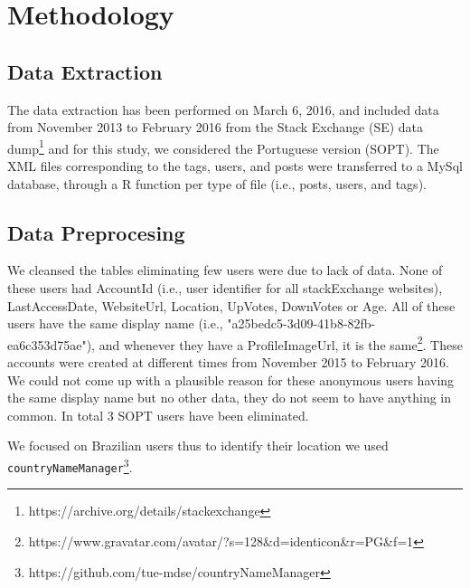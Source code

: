 \section{Methodology}
\subsection{Data Extraction}
\noindent The data extraction has been performed on March 6, 2016, and included data from November 2013 to February 2016 from the Stack Exchange (SE) data dump\footnote{https://archive.org/details/stackexchange} and for this study, we considered the Portuguese version (SOPT). The XML files corresponding to the tags, users, and posts were transferred to a MySql database, through a R function per type of file (i.e., posts, users, and tags). 
\subsection{Data Preprocesing}
We cleansed the tables eliminating few users were due to lack of data. None of these users had AccountId (i.e., user identifier for all stackExchange websites), LastAccessDate, WebsiteUrl, Location, UpVotes, DownVotes or Age. All of these users have the same display name (i.e., "a25bedc5-3d09-41b8-82fb-ea6c353d75ae"), and whenever they have a ProfileImageUrl, it is the same\footnote{https://www.gravatar.com/avatar/?s=128\&d=identicon\&r=PG\&f=1}. These accounts were created at different times from November 2015 to February 2016. We could not come up with a plausible reason for these anonymous users having the same display name but no other data, they do not seem to have anything in common. In total 3 SOPT users have been eliminated. 

We focused on Brazilian users thus to identify their location we used \texttt{countryNameManager}\footnote{https://github.com/tue-mdse/countryNameManager}.

